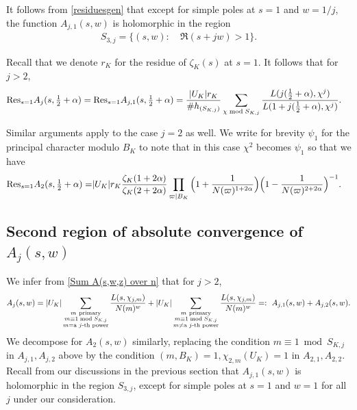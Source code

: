 \documentclass[twoside,leqno,10pt, A4]{amsart}
\begin{document}
It follows from \eqref{residuesgen} that except for simple poles at $s=1$ and $w=1/j$, the function $A_{j,1}(s,w)$ is holomorphic in the region
\begin{align} \label{S3}
	S_{3,j}=\Big\{(s,w):\ &  \Re(s+jw)>1 \Big\}.
\end{align}

   Recall that we denote $r_K$ for the residue of $\zeta_K(s)$ at $s = 1$. It follows that for $j>2$,
\begin{align}
\label{Residue at s=1}
 \mathrm{Res}_{s=1}& A_j(s, \tfrac{1}{2}+\alpha) = \mathrm{Res}_{s=1} A_{j,1}(s, \tfrac{1}{2}+\alpha)
=\frac {|U_K|r_K}{\#h_{(S_{K,j})}}\sum_{\chi \bmod {S_{K,j}}} \frac{L(j(\tfrac{1}{2}+\alpha), \chi^j)}{L(1+j(\tfrac{1}{2}+\alpha), \chi^j)}.
\end{align}

  Similar arguments apply to the case $j=2$ as well. We write for brevity $\psi_1$ for the principal character modulo $B_K$ to note that in this case $\chi^2$ becomes $\psi_1$ so that we have
\begin{align}
\label{Residue at s=1j=2}
\begin{split}
 \mathrm{Res}_{s=1} A_2(s, \tfrac{1}{2}+\alpha) =&
|U_K|r_K \frac{\zeta_K(1+2\alpha)}{\zeta_K(2+2\alpha)}\prod_{\varpi | B_K}\Big(1+\frac 1{N(\varpi)^{1+2\alpha}}\Big )\Big(1-\frac
1{N(\varpi)^{2+2\alpha}}\Big )^{-1}.
\end{split}
\end{align}


\subsection{Second region of absolute convergence of $A_j(s,w)$}

 We infer from \eqref{Sum A(s,w,z) over n} that for $j>2$,
\begin{align} \label{A1A2}
 A_j(s,w) = |U_K|\sum_{\substack{m \odd \\ m \equiv 1 \bmod {S_{K,j}} \\ m =  \text{a $j$-th power}}}\frac{L( s, \chi_{j,m})}{N(m)^w}
+|U_K|\sum_{\substack{m \odd \\ m \equiv 1 \bmod {S_{K,j}} \\ m \neq  \text{a $j$-th power}}}\frac{L( s, \chi_{j,m})}{N(m)^w} =: \ A_{j,1}(s,w)+A_{j,2}(s,w).
\end{align}
  We decompose for $A_2(s,w)$ similarly, replacing the condition $m \equiv 1 \bmod {S_{K,j}}$ in $A_{j,1}, A_{j,2}$ above by the condition $(m, B_K)=1, \chi_{2,m}(U_K) =1$ in $A_{2,1}, A_{2,2}$.  Recall from our discussions in the previous section that $A_{j,1}(s,w)$ is holomorphic in the region $S_{3,j}$, except for simple poles at $s=1$ and $w=1$ for all $j$ under our consideration. \newline
\end{document}
